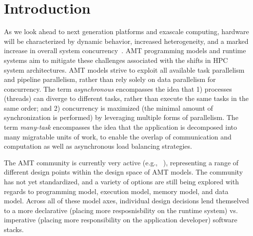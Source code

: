 \chapter{Introduction}
\label{chap:introduction}
As we look ahead to next generation platforms and exascale computing,  hardware 
will be characterized by dynamic behavior, increased
heterogeneity, and a marked increase in overall system \gls{concurrency}~\cite{doe_arch, dav_exascale}. 
\gls{AMT} \glspl{programming model} and \glspl{runtime system} 
aim to mitigate these challenges associated with the shifts in \gls{HPC} system architectures.  
\gls{AMT} models strive to exploit all available \gls{task parallelism} and
\gls{pipeline parallelism}, rather than rely solely on \gls{data parallelism}
for \gls{concurrency}. The term {\em \gls{asynchronous}} encompasses the idea that 
1) processes (threads) can diverge to different tasks, rather than execute 
the same tasks in the same order; and 2) \gls{concurrency} is maximized (the 
  minimal amount of synchronization is performed) by 
leveraging multiple forms of parallelism. The term {\em many-task} encompasses 
the idea that the application is decomposed into many 
\gls{migratable} units of work, to enable the overlap of communication and 
computation as well as asynchronous load balancing strategies.

The \gls{AMT} community is currently very active (e.g.,
~\cite{OCR,STAPL,Legion,Realm,StencilHPX,Charm++,Uintah,Loci,PARSEC,DaGuE,Cilk}),
representing a range of different design points within the
design space of \gls{AMT} models. The community has not yet standardized, and
a variety of options are still being explored with regards to \gls{programming model},
\gls{execution model}, \gls{memory model}, and \gls{data model}.  Across all of
these model axes, individual design decisions lend themselved to a more
\gls{declarative} (placing more resposnisbility on the \gls{runtime system}) vs.  
\gls{imperative} (placing more responsibility on the application developer)
software stacks. 

